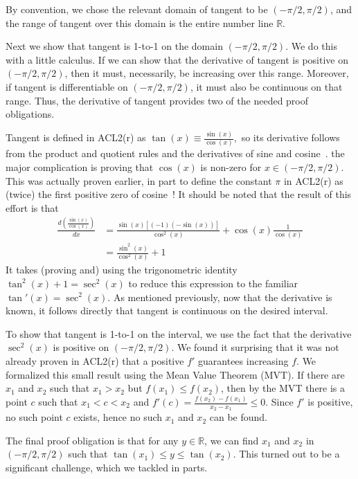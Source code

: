 \documentclass[copyright,creativecommons]{eptcs}
\begin{document}
By convention, we chose the relevant domain of tangent to be $(-\pi/2,
\pi/2)$, and the range of tangent over this domain is the entire
number line $\mathbb{R}$. 

Next we show that tangent is 1-to-1 on the domain $(-\pi/2,
\pi/2)$. We do this with a little calculus. If we can show that the
derivative of tangent is positive on $(-\pi/2, \pi/2)$, then it must,
necessarily, be increasing over this range. Moreover, if tangent is
differentiable on $(-\pi/2, \pi/2)$, it must also be continuous on
that range. Thus, the derivative of tangent provides two of the needed
proof obligations.

Tangent is defined in ACL2(r) as $\tan(x) \equiv
\frac{\sin(x)}{\cos(x)},$ so its derivative follows from the product and
quotient
rules and the derivatives of sine and
cosine~\cite{GaCo:chain-rule,ReGa:automatic-differentiator}. the major
complication is proving that $\cos(x)$ is non-zero for $x\in (-\pi/2,
\pi/2)$. This was actually proven earlier, in part to define the 
constant $\pi$ in ACL2(r) as (twice) the first positive zero of
cosine~\cite{Gam:dissertation}!  It should be noted that the result of
this effort is that
\begin{align}
\frac{d(\frac{\sin(x)}{\cos(x)})}{dx} & = \frac{\sin(x)  [(-1)(-\sin(x))]}{\cos^2(x)} + \cos(x) \frac{1}{\cos(x)} \\
&= \frac{\sin^2(x)}{\cos^2(x)} + 1
\end{align}
It takes (proving and) using the trigonometric identity $\tan^2(x) + 1
= \sec^2(x)$ to reduce this expression to the familiar $\tan'(x) =
\sec^2(x)$. As mentioned previously, now that the derivative is known,
it follows directly that tangent is continuous on the desired interval.

To show that tangent is 1-to-1 on the interval, we use the fact that
the derivative $\sec^2(x)$ is positive on $(-\pi/2,
\pi/2)$. We found it surprising that it was not already proven in
ACL2(r) that a positive $f'$ guarantees increasing $f$. We
formalized this small result using the Mean Value Theorem
(MVT). If there are $x_1$ and $x_2$ such that $x_1 > x_2$
but $f(x_1) \le f(x_2)$, then by the MVT there is a point $c$ such that
$x_1 < c < x_2$ and $f'(c) = \frac{f(x_2)-f(x_1)}{x_2-x_1} \le 0$. Since
$f'$ is positive, no such point $c$ exists, hence no such $x_1$ and
$x_2$ can be found.

The final proof obligation is that for any $y\in\mathbb{R}$, we can
find $x_1$ and $x_2$ in $(-\pi/2, \pi/2)$ such that $\tan(x_1) \le y \le
\tan(x_2)$.  This turned out to be a significant challenge, which we
tackled in parts.
\end{document}
